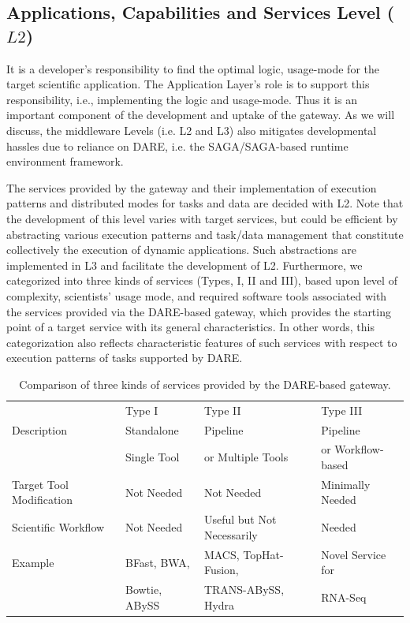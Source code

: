 \documentclass[]{svjour3}
\begin{document}
\subsection{Applications, Capabilities and Services Level ($L2$)}

It is a developer's responsibility to find the optimal logic,
usage-mode for the target scientific application. The Application
Layer's role is to support this responsibility, i.e., implementing the
logic and usage-mode. Thus it is an important component of the
development and uptake of the gateway. As we will discuss, the
middleware Levels (i.e. L2 and L3) also mitigates developmental
hassles due to reliance on DARE, i.e. the SAGA/SAGA-based runtime
environment framework.

The services provided by the gateway and their implementation of
execution patterns and distributed modes for tasks and data are
decided with L2. Note that the development of this level varies with
target services, but could be efficient by abstracting various
execution patterns and task/data management that constitute
collectively the execution of dynamic applications. Such abstractions
are implemented in L3 and facilitate the development of
L2. Furthermore, we categorized into three kinds of services (Types,
I, II and III), based upon level of complexity, scientists' usage
mode, and required software tools associated with the services
provided via the DARE-based gateway, which provides the starting point
of a target service with its general characteristics. In other words,
this categorization also reflects characteristic features of such
services with respect to execution patterns of tasks supported by
DARE.

\begin{table}[!h]
\centering
\begin{tabular}{| l | l | l | l |} \hline \rowcolor[rgb]{0.8,0.8,0.8} &
Type I & Type II & Type III \\ Description & Standalone  & Pipeline & Pipeline \\ 
& Single Tool  & or Multiple Tools &  or Workflow-based \\\hline 
Target Tool Modification & Not Needed &
Not Needed & Minimally Needed \\ \hline Scientific Workflow & Not Needed & Useful but Not Necessarily &
Needed \\ \hline 
Example & BFast, BWA,  & MACS, TopHat-Fusion,  &   Novel Service for 
 \\
 &  Bowtie, ABySS  & TRANS-ABySS, Hydra & RNA-Seq \\
\hline
\end{tabular}
 \caption{Comparison of three kinds of services provided by the DARE-based gateway. }
\label{table:three-type-service}
\end{table}
\end{document}
